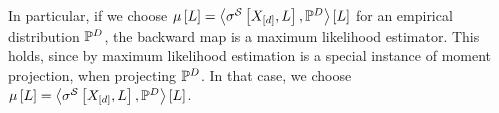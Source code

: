 In particular, if we choose $\mu\left[L\right]=\left\langle \sigma^{\mathcal{S}}\left[X_{[d]},L\right],\mathbb{P}^{D}\right\rangle \left[ L \right]$ for an empirical distribution $\mathbb{P}^{D}$, the backward map is a maximum likelihood estimator.
This holds, since by  maximum likelihood estimation is a special instance of moment projection, when projecting $\mathbb{P}^{D}$.
In that case, we choose $\mu\left[L\right]=\left\langle \sigma^{\mathcal{S}}\left[X_{[d]},L\right],\mathbb{P}^{D}\right\rangle \left[ L \right]$.





